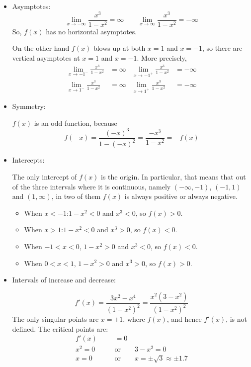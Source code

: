 \begin{solution}
\begin{itemize}
\item Asymptotes:
\[\lim_{x \to -\infty}\frac{x^3}{1-x^2}=\infty \qquad
\lim_{x \to \infty}\frac{x^3}{1-x^2}=-\infty \]
So, $f(x)$ has no horizontal asymptotes.

 On the other hand $f(x)$ blows up at both $x=1$
and $x=-1$, so there are vertical asymptotes at $x=1$ and $x=-1$.
More precisely,
\begin{align*}
\lim_{x \to -1^-}\frac{x^3}{1-x^2}&=\infty
&
\lim_{x \to -1^+}\frac{x^3}{1-x^2}&=-\infty\\
\lim_{x \to 1^-}\frac{x^3}{1-x^2}&=\infty
&
\lim_{x \to 1^+}\frac{x^3}{1-x^2}&=-\infty
\end{align*}

\item Symmetry:

$f(x)$ is an odd function, because
\[f(-x)=\frac{(-x)^3}{1-(-x)^2}=\frac{-x^3}{1-x^2}=-f(x)\]

\item Intercepts:

The only intercept of $f(x)$ is the origin. In particular, that means that out of the three intervals where it is continuous,
                  namely $(-\infty,-1)$, $(-1,1)$ and $(1,\infty)$, in two of them $f(x)$ is always positive or always negative.
\begin{itemize}
\item When $x<-1$:\quad $1-x^2<0$ and $x^3<0$, so $f(x)>0$.
\item When $x>1$:\qquad $1-x^2<0$ and $x^3>0$, so $f(x)<0$.
\item When $-1<x<0$, $1-x^2>0$ and $x^3<0$, so $f(x)<0$.
\item When $0<x<1$, $1-x^2>0$ and $x^3>0$, so $f(x)>0$.
\end{itemize}

\item Intervals of increase and decrease:

\[f'(x)=\dfrac{3x^2-x^4}{(1-x^2)^2}=\frac{x^2(3-x^2)}{(1-x^2)^2}\]
The only singular points are $x=\pm 1$, where $f(x)$, and hence $f'(x)$, is not defined. The critical points are:
\begin{align*}
f'(x)&=0\\
x^2=0\qquad&\mbox{or}\qquad 3-x^2=0\\
x=0\qquad&\mbox{or}\qquad x=\pm\sqrt{3}\approx\pm 1.7
\end{align*}


\end{itemize}
\end{solution}
